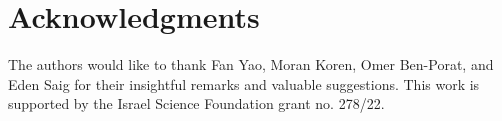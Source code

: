 \section*{Acknowledgments}
The authors would like to thank Fan Yao, Moran Koren, Omer Ben-Porat, and Eden Saig for their insightful remarks and valuable suggestions. 
This work is supported by the Israel Science Foundation
grant no. 278/22.